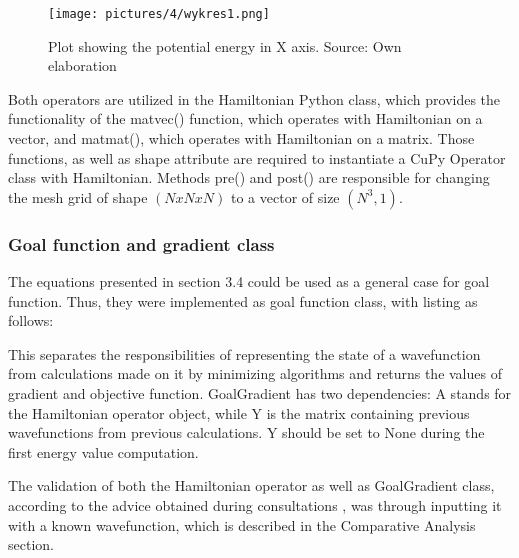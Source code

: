 \begin{figure}[h]
	\centering
	\texttt{[image: pictures/4/wykres1.png]}
	\caption{Plot showing the potential energy in X axis. Source: Own elaboration}
	\label{fig:potential}
\end{figure}

Both operators are utilized in the Hamiltonian Python class, which provides the functionality of the matvec() function, which operates with Hamiltonian on a vector, and matmat(), which operates with Hamiltonian on a matrix. Those functions, as well as shape attribute are required to instantiate a CuPy Operator class with Hamiltonian. Methods pre() and post() are responsible for changing the mesh grid of shape $(N x N x N)$ to a vector of size $(N^3, 1)$.


\vspace{0.2cm}



\subsubsection{Goal function and gradient class}

The equations presented in section 3.4 could be used as a general case for goal function. Thus, they were implemented as goal function class, with listing as follows:

\vspace{0.2cm}


This separates the responsibilities of representing the state of a wavefunction from calculations made on it by minimizing algorithms and returns the values of gradient and objective function. GoalGradient has two dependencies: A stands for the Hamiltonian operator object, while Y is the matrix containing previous wavefunctions from previous calculations. Y should be set to None during the first energy value computation.

The validation of both the Hamiltonian operator as well as GoalGradient class, according to the advice obtained during consultations \cite{SytySienkiewicz}, was through inputting it with a known wavefunction, which is described in the Comparative Analysis section.

\vspace{0.2cm}


